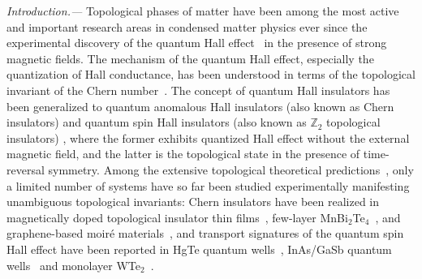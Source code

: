 \documentclass[aps,prl,twocolumn,superscriptaddress,longbibliography]{revtex4-2}
\begin{document}
\textit{Introduction.---} Topological phases of matter have been among the most active and important research areas in condensed matter physics ever since the experimental discovery of the quantum Hall effect~\cite{vonklitzing1980new} in the presence of strong magnetic fields.
The mechanism of the quantum Hall effect, especially the quantization of Hall conductance, has been understood in terms of the topological invariant of the Chern number~\cite{thouless1982quantized,niu1985quantized}.
The concept of quantum Hall insulators has been generalized to quantum anomalous Hall insulators (also known as Chern insulators) \cite{haldane1988model} and quantum spin Hall insulators (also known as $\mathbb{Z}_2$ topological insulators) \cite{kane2005quantum}, where the former exhibits quantized Hall effect without the external magnetic field, and the latter is the topological state in the presence of time-reversal symmetry.
Among the extensive topological theoretical predictions~\cite{onoda2003quantized,qi2006topological,qi2008topological,liu2008quantum,yu2010quantized,qiao2010quantum,nomura2011surfacequantized,zhang2019topological,li2019intrinsic,otrokov2019prediction,liu2008quantuma,zhang2019nearly,bernevig2006quantum,sheng2006quantum,qian2014quantum}, only a limited number of systems have so far been studied experimentally manifesting unambiguous topological invariants: Chern insulators have been realized in magnetically doped topological insulator thin films~\cite{chang2013experimental,zhao2020tuning}, few-layer MnBi$_2$Te$_4$~\cite{deng2020quantum,liu2020robust}, and graphene-based moir\'e materials~\cite{sharpe2019emergent,serlin2020intrinsic,chen2020tunable,polshyn2020electrical,polshyn2022topological}, and transport signatures of the quantum spin Hall effect have been reported in HgTe quantum wells~\cite{konig2007quantum}, InAs/GaSb quantum wells~\cite{knez2010finite,knez2011evidence} and monolayer WTe$_2$~\cite{fei2017edge,wu2018observation}.
\end{document}
